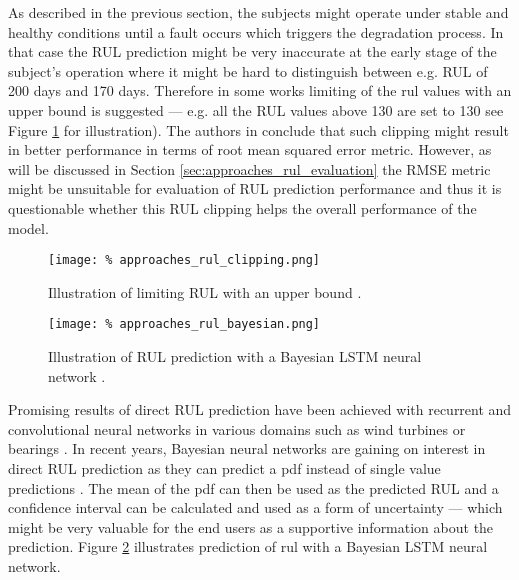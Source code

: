 As described in the previous section, the subjects might operate under stable and healthy conditions until a fault occurs which triggers the degradation process.
In that case the RUL prediction might be very inaccurate at the early stage of the subject's operation where it might be hard to distinguish between e.g. RUL of 200 days and 170 days.
Therefore in some works limiting of the \acrshort{rul} values with an upper bound is suggested \cite{jayasinghe2018temporal} --- e.g. all the RUL values above 130 are set to 130  see Figure \ref{fig:approaches_rul_clipping} for illustration).
The authors in \cite{jayasinghe2018temporal} conclude that such clipping might result in better performance in terms of root mean squared error metric.
However, as will be discussed in Section \ref{sec:approaches_rul_evaluation} the RMSE metric might be unsuitable for evaluation of RUL prediction performance and thus it is questionable whether this RUL clipping helps the overall performance of the model.

\begin{figure}
    \centering
    \texttt{[image: \%
        approaches\_rul\_clipping.png]}
    \caption{Illustration of limiting RUL with an upper bound \cite{jayasinghe2018temporal}.}
    \label{fig:approaches_rul_clipping}
\end{figure}

\begin{figure}
    \centering
    \texttt{[image: \%
        approaches\_rul\_bayesian.png]}
    \caption{Illustration of RUL prediction with a Bayesian LSTM neural network  \cite{louw2018remaining}.}
    \label{fig:approaches_rul_bayesian}
\end{figure}

Promising results of direct RUL prediction have been achieved with recurrent and convolutional neural networks in various domains such as wind turbines or bearings \cite{mahamad2010predicting, babu2016deep}.
In recent years, Bayesian neural networks are gaining on interest in direct RUL prediction as they can predict a \gls{pdf} instead of single value predictions \cite{peng2019bayesian, louw2018remaining}.
The mean of the \gls{pdf} can then be used as the predicted RUL and a confidence interval can be calculated and used as a form of uncertainty --- which might be very valuable for the end users as a supportive information about the prediction.
Figure \ref{fig:approaches_rul_bayesian} illustrates prediction of \gls{rul} with a Bayesian LSTM neural network.

